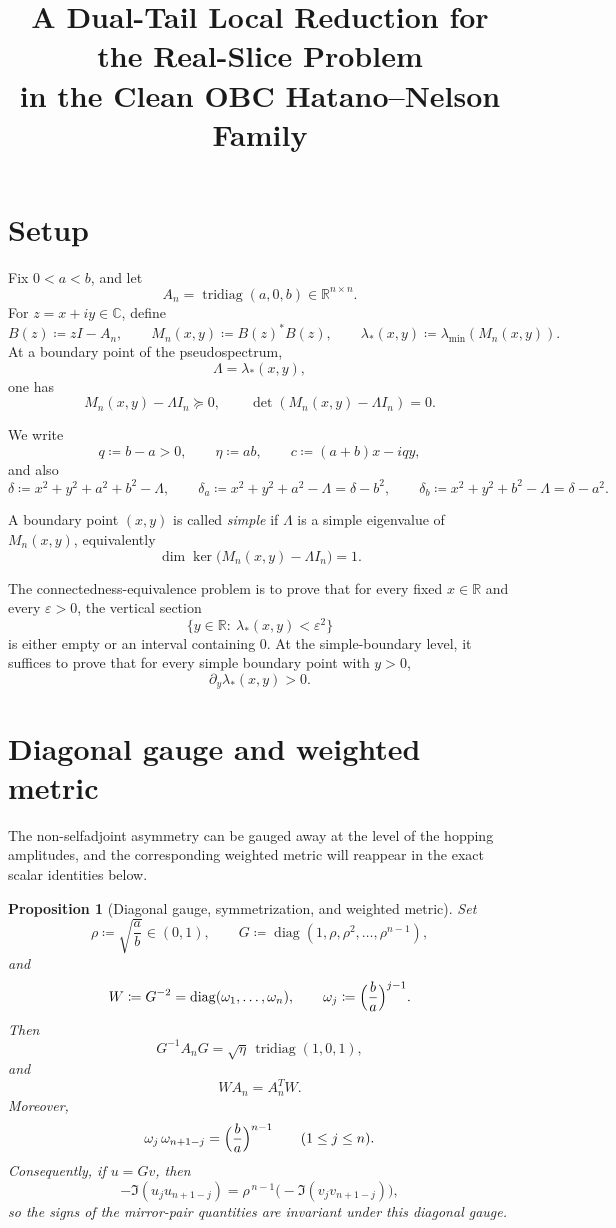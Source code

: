 \documentclass[11pt]{article}
\title{A Dual-Tail Local Reduction for the Real-Slice Problem\\
in the Clean OBC Hatano--Nelson Family}
\author{}
\date{}
\newtheorem{proposition}[theorem]{Proposition}
\newcommand{\C}{\mathbb C}
\newcommand{\R}{\mathbb R}
\newcommand{\eps}{\varepsilon}
\begin{document}
\maketitle

\section{Setup}

Fix \(0<a<b\), and let
\[
A_n=\operatorname{tridiag}(a,0,b)\in\R^{n\times n}.
\]
For \(z=x+iy\in\C\), define
\[
B(z)\coloneqq zI-A_n,
\qquad
M_n(x,y)\coloneqq B(z)^*B(z),
\qquad
\lambda_*(x,y)\coloneqq \lambda_{\min}(M_n(x,y)).
\]
At a boundary point of the pseudospectrum,
\[
\Lambda=\lambda_*(x,y),
\]
one has
\[
M_n(x,y)-\Lambda I_n \succeq 0,
\qquad
\det(M_n(x,y)-\Lambda I_n)=0.
\]

We write
\[
q\coloneqq b-a>0,
\qquad
\eta\coloneqq ab,
\qquad
c\coloneqq (a+b)x-iqy,
\]
and also
\[
\delta\coloneqq x^2+y^2+a^2+b^2-\Lambda,
\qquad
\delta_a\coloneqq x^2+y^2+a^2-\Lambda=\delta-b^2,
\qquad
\delta_b\coloneqq x^2+y^2+b^2-\Lambda=\delta-a^2.
\]

A boundary point \((x,y)\) is called \emph{simple} if \(\Lambda\) is a simple eigenvalue of
\(M_n(x,y)\), equivalently
\[
\dim\ker\bigl(M_n(x,y)-\Lambda I_n\bigr)=1.
\]

The connectedness-equivalence problem is to prove that for every fixed \(x\in\R\) and every
\(\eps>0\), the vertical section
\[
\{y\in\R:\ \lambda_*(x,y)<\eps^2\}
\]
is either empty or an interval containing \(0\). At the simple-boundary level, it suffices to
prove that for every simple boundary point with \(y>0\),
\[
\partial_y \lambda_*(x,y)>0.
\]

\section{Diagonal gauge and weighted metric}

The non-selfadjoint asymmetry can be gauged away at the level of the hopping amplitudes, and the
corresponding weighted metric will reappear in the exact scalar identities below.

\begin{proposition}[Diagonal gauge, symmetrization, and weighted metric]\label{prop:gauge}
Set
\[
\rho\coloneqq \sqrt{\frac ab}\in(0,1),
\qquad
G\coloneqq \operatorname{diag}(1,\rho,\rho^2,\dots,\rho^{n-1}),
\]
and
\[
W\coloneqq G^{-2}
=
\operatorname{diag}(\omega_1,\dots,\omega_n),
\qquad
\omega_j\coloneqq \Bigl(\frac ba\Bigr)^{j-1}.
\]
Then
\[
G^{-1}A_nG=\sqrt{\eta}\,\operatorname{tridiag}(1,0,1),
\]
and
\[
WA_n=A_n^T W.
\]
Moreover,
\[
\omega_j\,\omega_{n+1-j}=\Bigl(\frac ba\Bigr)^{n-1}
\qquad (1\le j\le n).
\]
Consequently, if \(u=Gv\), then
\[
-\Im(u_j u_{n+1-j})
=
\rho^{\,n-1}\bigl(-\Im(v_j v_{n+1-j})\bigr),
\]
so the signs of the mirror-pair quantities are invariant under this diagonal gauge.
\end{proposition}
\end{document}
